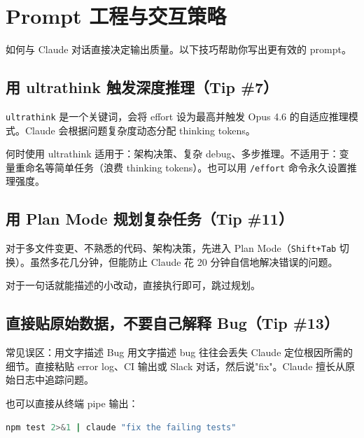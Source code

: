 \documentclass[a4paper]{article}
\begin{document}
\section{Prompt 工程与交互策略}

如何与 Claude 对话直接决定输出质量。以下技巧帮助你写出更有效的 prompt。

\subsection{用 ultrathink 触发深度推理（Tip \#7）}

\texttt{ultrathink} 是一个关键词，会将 effort 设为最高并触发 Opus 4.6 的自适应推理模式。Claude 会根据问题复杂度动态分配 thinking tokens。

\begin{importantbox}{何时使用 ultrathink}
适用于：架构决策、复杂 debug、多步推理。不适用于：变量重命名等简单任务（浪费 thinking tokens）。也可以用 \texttt{/effort} 命令永久设置推理强度。
\end{importantbox}

\subsection{用 Plan Mode 规划复杂任务（Tip \#11）}

对于多文件变更、不熟悉的代码、架构决策，先进入 Plan Mode（\texttt{Shift+Tab} 切换）。虽然多花几分钟，但能防止 Claude 花 20 分钟自信地解决错误的问题。

对于一句话就能描述的小改动，直接执行即可，跳过规划。

\subsection{直接贴原始数据，不要自己解释 Bug（Tip \#13）}

\begin{warningbox}{常见误区：用文字描述 Bug}
用文字描述 bug 往往会丢失 Claude 定位根因所需的细节。直接粘贴 error log、CI 输出或 Slack 对话，然后说"fix"。Claude 擅长从原始日志中追踪问题。
\end{warningbox}

也可以直接从终端 pipe 输出：

\begin{lstlisting}[caption={管道传输错误信息}, language=bash]
npm test 2>&1 | claude "fix the failing tests"
\end{lstlisting}
\end{document}
